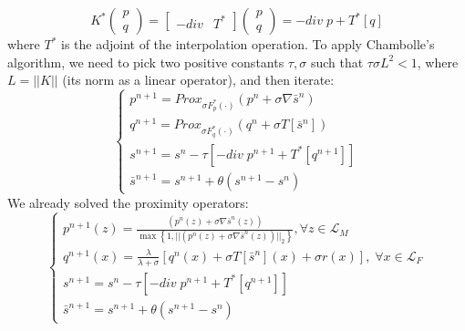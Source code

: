 \documentclass[12pt,draftcls, onecolumn, letterpaper,compsoc]{IEEEtran}
\begin{document}
\begin{equation}
	K^{*}\left(\begin{array}{l}p\\q\end{array}\right) = 
	\left[\begin{array}{cc}
		-div & T^{*}
	\end{array}\right]\left(\begin{array}{l}p\\q\end{array}\right) = 
	-div\;p + T^{*}[q]
\end{equation}
where $T^{*}$ is the adjoint of the interpolation operation. To apply Chambolle's algorithm, we need to pick two positive constants $\tau, \sigma$ such that $\tau\sigma L^{2} < 1$, where $L=||K||$ (its norm as a linear operator), and then iterate:
\begin{equation}
	\left\lbrace\begin{array}{l}
		p^{n+1} = Prox_{\sigma F_{p}^{*}(\cdot)}(p^{n} + \sigma \nabla \bar{s}^{n})\\
		q^{n+1} = Prox_{\sigma F_{q}^{*}(\cdot)}(q^{n} + \sigma T[\bar{s}^{n}])\\
		s^{n+1} = s^{n} - \tau \left[-div\;p^{n+1} + T^{*}[q^{n+1}]\right]\\
		\bar{s}^{n+1} = s^{n+1}+\theta(s^{n+1} - s^{n})
	\end{array}\right.
\end{equation}
We already solved the proximity operators:
\begin{equation}
	\left\lbrace\begin{array}{l}
		p^{n+1}(z) = \frac{(p^{n}(z) + \sigma \nabla \bar{s}^{n}(z))}{\max\left\lbrace1, ||(p^{n}(z) + \sigma \nabla \bar{s}^{n}(z))||_{2}\right\rbrace}, \forall z\in \mathcal{L}_{M}\\
		q^{n+1}(x) = \frac{\lambda}{\lambda+\sigma}\left[q^{n}(x) + \sigma T[\bar{s}^{n}](x) + \sigma r(x)\right],\; \forall x\in \mathcal{L}_F\\
		s^{n+1} = s^{n} - \tau \left[-div\;p^{n+1} + T^{*}[q^{n+1}]\right]\\
		\bar{s}^{n+1} = s^{n+1}+\theta(s^{n+1} - s^{n})
	\end{array}\right.
\end{equation}
\end{document}
